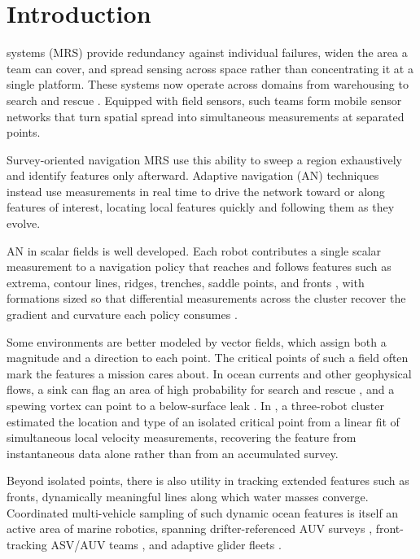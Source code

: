 \documentclass[lettersize,journal]{IEEEtran}
\begin{document}
\section{Introduction}

 systems (MRS) provide redundancy against
individual failures, widen the area a team can cover, and spread
sensing across space rather than concentrating it at a single
platform. These systems now operate across domains from warehousing
to search and rescue \cite{1}. Equipped with field sensors, such
teams form mobile sensor networks that turn spatial spread into
simultaneous measurements at separated points.

Survey-oriented navigation MRS use this ability to sweep a region
exhaustively and identify features only afterward. Adaptive navigation (AN) techniques instead use
measurements in real time to drive the network toward or along
features of interest, locating local features quickly and following
them as they evolve.

AN in scalar fields is well developed. Each robot contributes a single
scalar measurement to a navigation policy that reaches and follows
features such as extrema, contour lines, ridges, trenches, saddle
points, and fronts \cite{2,3,4,5}, with formations sized so that
differential measurements across the cluster recover the gradient and
curvature each policy consumes \cite{2,6}.

Some environments are better modeled by vector fields, which assign
both a magnitude and a direction to each point. The critical points of
such a field often mark the features a mission cares about. In ocean
currents and other geophysical flows, a sink can flag an area of high
probability for search and rescue \cite{7}, and a spewing vortex can
point to a below-surface leak \cite{8}.
In \cite{9}, a three-robot cluster estimated the location and type of
an isolated critical point from a linear fit of simultaneous local
velocity measurements, recovering the feature from instantaneous data
alone rather than from an accumulated survey.

Beyond isolated points, there is also utility in tracking extended
features such as fronts, dynamically meaningful lines along which
water masses converge. Coordinated multi-vehicle sampling of such
dynamic ocean features is itself an active area of marine robotics,
spanning drifter-referenced AUV surveys \cite{10}, front-tracking
ASV/AUV teams \cite{11}, and adaptive glider fleets \cite{12}.
\end{document}
